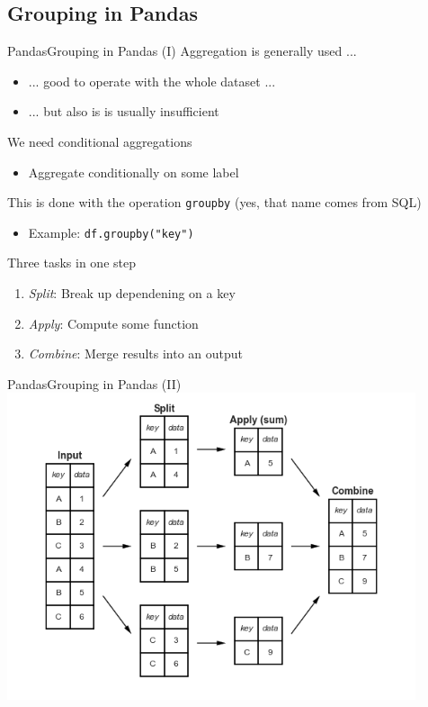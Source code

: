 \documentclass[10pt,compress]{beamer} %
\begin{document}
\subsection{Grouping in Pandas}
\begin{frame}{Pandas}{Grouping in Pandas (I)}
		Aggregation is generally used ...
		\begin{itemize}
			\item ... good to operate with the whole dataset ...
			\item ... but also is is usually insufficient
		\end{itemize}
		We need conditional aggregations
		\begin{itemize}
			\item Aggregate conditionally on some label
		\end{itemize}
		This is done with the operation \texttt{groupby} (yes, that name comes from SQL)
		\begin{itemize}
			\item Example: \texttt{df.groupby("key")}
		\end{itemize}
		Three tasks in one step
		\begin{enumerate}
			\item \textit{Split}: Break up dependening on a key
			\item \textit{Apply}: Compute some function
			\item \textit{Combine}: Merge results into an output
		\end{enumerate}
\end{frame}

\begin{frame}{Pandas}{Grouping in Pandas (II)}
	\centering \includegraphics[width=0.9\textwidth]{figs/03.08-split-apply-combine.png}\\
\end{frame}
\end{document}
